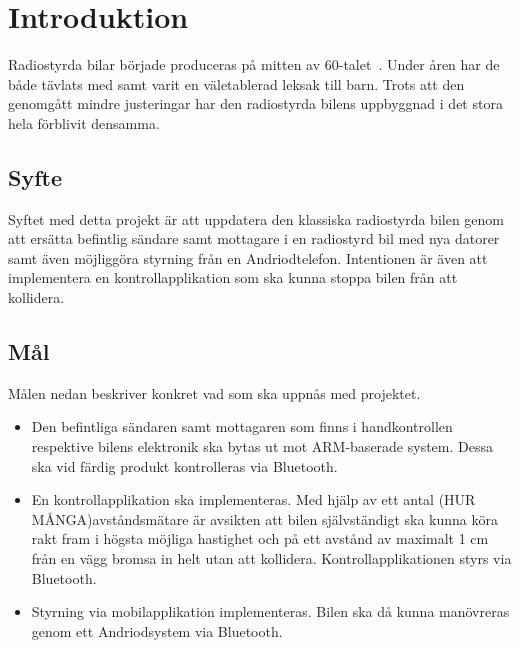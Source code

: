 \documentclass[a4paper]{article}
\begin{document}
\newpage
\section{Introduktion}

Radiostyrda bilar började produceras på mitten av 60-talet~\cite{RCHistory}. Under åren har de både tävlats med samt varit en väletablerad leksak till barn. Trots att den genomgått mindre justeringar har den radiostyrda bilens uppbyggnad i det stora hela förblivit densamma.

\subsection{Syfte}

Syftet med detta projekt är att uppdatera den klassiska radiostyrda bilen genom att ersätta befintlig sändare samt mottagare i en radiostyrd bil med nya datorer samt även möjliggöra styrning från en Andriodtelefon. Intentionen är även att implementera en kontrollapplikation som ska kunna stoppa bilen från att kollidera.




\subsection{Mål}
Målen nedan beskriver konkret vad som ska uppnås med projektet.

\begin{itemize}
\item Den befintliga sändaren samt mottagaren som finns i handkontrollen respektive bilens elektronik ska bytas ut mot ARM-baserade system. Dessa ska vid färdig produkt kontrolleras via Bluetooth.
\item En kontrollapplikation ska implementeras. Med hjälp av ett antal (HUR MÅNGA)avståndsmätare är avsikten att bilen självständigt ska kunna köra rakt fram i högsta möjliga hastighet och på ett avstånd av maximalt 1 cm från en vägg bromsa in helt utan att kollidera. Kontrollapplikationen styrs via Bluetooth.
\item Styrning via mobilapplikation implementeras. Bilen ska då kunna manövreras genom ett Andriodsystem via Bluetooth.
\end{itemize}


\end{document}
